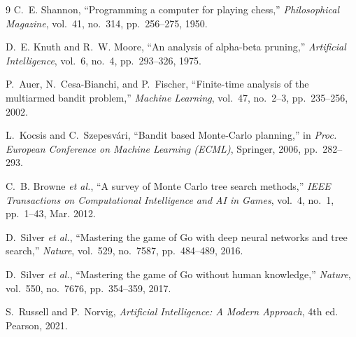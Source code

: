 \documentclass[conference]{IEEEtran}
\begin{document}
\begin{thebibliography}{9}
C.~E. Shannon, ``Programming a computer for playing chess,'' \emph{Philosophical Magazine}, vol.~41, no.~314, pp.~256--275, 1950.

D.~E. Knuth and R.~W. Moore, ``An analysis of alpha-beta pruning,'' \emph{Artificial Intelligence}, vol.~6, no.~4, pp.~293--326, 1975.

P.~Auer, N.~Cesa-Bianchi, and P.~Fischer, ``Finite-time analysis of the multiarmed bandit problem,'' \emph{Machine Learning}, vol.~47, no.~2--3, pp.~235--256, 2002.

L.~Kocsis and C.~Szepesv\'ari, ``Bandit based Monte-Carlo planning,'' in \emph{Proc. European Conference on Machine Learning (ECML)}, Springer, 2006, pp.~282--293.

C.~B. Browne \emph{et al.}, ``A survey of Monte Carlo tree search methods,'' \emph{IEEE Transactions on Computational Intelligence and AI in Games}, vol.~4, no.~1, pp.~1--43, Mar. 2012.

D.~Silver \emph{et al.}, ``Mastering the game of Go with deep neural networks and tree search,'' \emph{Nature}, vol.~529, no.~7587, pp.~484--489, 2016.

D.~Silver \emph{et al.}, ``Mastering the game of Go without human knowledge,'' \emph{Nature}, vol.~550, no.~7676, pp.~354--359, 2017.

S.~Russell and P.~Norvig, \emph{Artificial Intelligence: A Modern Approach}, 4th ed. Pearson, 2021.
\end{thebibliography}
\end{document}
